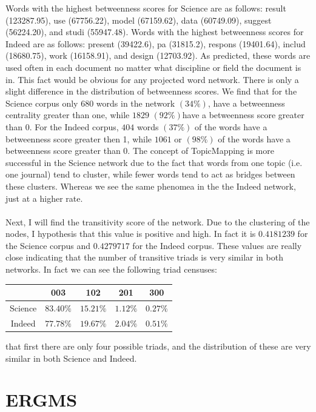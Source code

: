 \documentclass[12pt]{article}
\begin{document}
Words with the highest betweenness scores for Science are as follows:  result (123287.95), use (67756.22), model (67159.62), data (60749.09), suggest (56224.20), and studi (55947.48). Words with the highest betweenness scores for Indeed are as follows:  present (39422.6), pa (31815.2), respons (19401.64), includ (18680.75), work (16158.91), and design (12703.92). As predicted, these words are used often in each document no matter what discipline or field the document is in. This fact would be obvious for any projected word network. There is only a slight difference in the distribution of betweenness scores. We find that for the Science corpus only $680$ words in the network $(34\%)$, have a betweenness centrality greater than one, while $1829$ $(92\%)$have a betweenness score greater than $0$. For the Indeed corpus, $404$ words $(37\%)$ of the words have a betweenness score greater then 1, while $1061$ or $(98\%)$ of the words have a betweenness score greater than 0. The concept of TopicMapping is more successful in the Science network due to the fact that words from one topic (i.e. one journal) tend to cluster, while fewer words tend to act as bridges between these clusters. Whereas we see the same phenomea in the the Indeed network, just at a higher rate.
\\
\\
Next, I will find the transitivity score of the network. Due to the clustering of the nodes, I hypothesis that this value is positive and high. In fact it is $0.4181239$ for the Science corpus and $0.4279717$ for the Indeed corpus. These values are really close indicating that the number of transitive triads is very similar in both networks. In fact we can see the following triad censuses:
\vspace{2mm}
\begin{center}
	\begin{tabular}{ |c||c|c|c|c|  }
		\hline
		&003&102&201&300 \\ 
		\hline 
		Science& $83.40\%$ & $15.21\%$ & $1.12\%$ & $0.27\%$ \\
		Indeed& $77.78\%$ & $19.67\%$ & $2.04\%$ & $0.51\%$ \\
		\hline
	\end{tabular}
\end{center}
\vspace{2mm}
that first there are only four possible triads, and the distribution of these are very similar in both Science and Indeed. 
\section{ERGMS}
\end{document}
